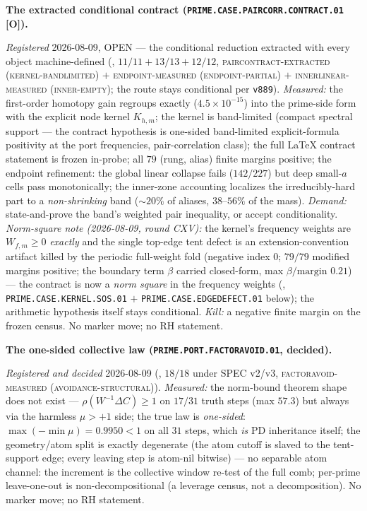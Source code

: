 \par\smallskip\noindent\textbf{The extracted conditional
contract
(\texttt{PRIME.CASE.PAIRCORR.\allowbreak CONTRACT.01} [O]).}
{\sloppy
\emph{Registered} 2026-08-09, OPEN --- the conditional
reduction extracted with every object machine-defined
(, $11/11 + 13/13 +
12/12$, \textsc{paircontract-extracted (kernel-bandlimited)}
$+$ \textsc{endpoint-measured (endpoint-partial)} $+$
\textsc{innerlinear-measured (inner-empty)}; the route stays
conditional per \texttt{v889}).  \emph{Measured:} the
first-order homotopy gain regroups exactly
($4.5\times10^{-15}$) into the prime-side form with the
explicit node kernel $K_{h,m}$; the kernel is band-limited
(compact spectral support --- the contract hypothesis is
one-sided band-limited explicit-formula positivity at the port
frequencies, pair-correlation class); the full LaTeX contract
statement is frozen in-probe; all $79$ (rung, alias) finite
margins positive; the endpoint refinement: the global linear
collapse fails ($142/227$) but deep small-$a$ cells pass
monotonically; the inner-zone accounting localizes the
irreducibly-hard part to a \emph{non-shrinking} band
(${\sim}20\%$ of aliases, $38$--$56\%$ of the mass).
\emph{Demand:} state-and-prove the band's weighted pair
inequality, or accept conditionality.  \emph{Norm-square note
(2026-08-09, round CXV):} the kernel's frequency weights are
$W_{f,m} \ge 0$ \emph{exactly} and the single top-edge tent
defect is an extension-convention artifact killed by the
periodic full-weight fold (negative index $0$; $79/79$ modified
margins positive; the boundary term $\beta$ carried closed-form,
max $\beta/\mathrm{margin}$ $0.21$) --- the contract is now a
\emph{norm square} in the frequency weights
(,
\texttt{PRIME.CASE.KERNEL.SOS.01} $+$
\texttt{PRIME.CASE.EDGEDEFECT.01} below); the arithmetic
hypothesis itself stays conditional.  \emph{Kill:} a negative
finite margin on the frozen census.  No marker move; no RH
statement.\par}


\par\smallskip\noindent\textbf{The one-sided collective law
(\texttt{PRIME.PORT.\allowbreak FACTORAVOID.01}, decided).}
{\sloppy
\emph{Registered and decided} 2026-08-09
(, $18/18$ under SPEC v2/v3,
\textsc{factoravoid-measured (avoidance-structural)}).
\emph{Measured:} the norm-bound theorem shape does not exist
--- $\rho(W^{-1}\Delta C) \ge 1$ on $17/31$ truth steps (max
$57.3$) but always via the harmless $\mu > +1$ side; the true
law is \emph{one-sided}: $\max(-\min\mu) = 0.9950 < 1$ on all
$31$ steps, which \emph{is} PD inheritance itself; the
geometry/atom split is exactly degenerate (the atom cutoff is
slaved to the tent-support edge; every leaving step is
atom-nil bitwise) --- no separable atom channel: the increment
is the collective window re-test of the full comb; per-prime
leave-one-out is non-decompositional (a leverage census, not a
decomposition).  No marker move; no RH statement.\par}


